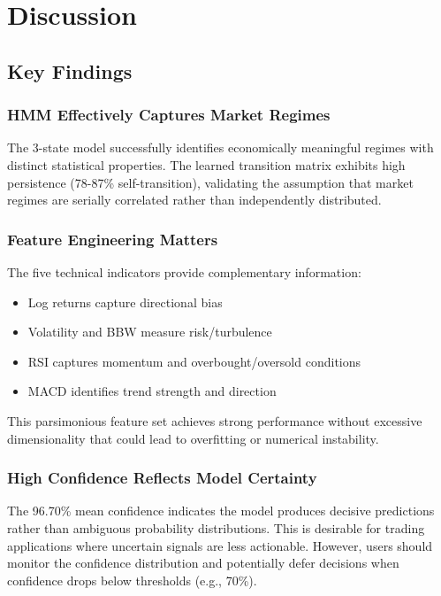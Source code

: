 \documentclass[conference]{IEEEtran}
\begin{document}
\section{Discussion}

\subsection{Key Findings}

\subsubsection{HMM Effectively Captures Market Regimes}
The 3-state model successfully identifies economically meaningful regimes with distinct statistical properties. The learned transition matrix exhibits high persistence (78-87\% self-transition), validating the assumption that market regimes are serially correlated rather than independently distributed.

\subsubsection{Feature Engineering Matters}
The five technical indicators provide complementary information:
\begin{itemize}
\item Log returns capture directional bias
\item Volatility and BBW measure risk/turbulence
\item RSI captures momentum and overbought/oversold conditions
\item MACD identifies trend strength and direction
\end{itemize}

This parsimonious feature set achieves strong performance without excessive dimensionality that could lead to overfitting or numerical instability.

\subsubsection{High Confidence Reflects Model Certainty}
The 96.70\% mean confidence indicates the model produces decisive predictions rather than ambiguous probability distributions. This is desirable for trading applications where uncertain signals are less actionable. However, users should monitor the confidence distribution and potentially defer decisions when confidence drops below thresholds (e.g., 70\%).
\end{document}
